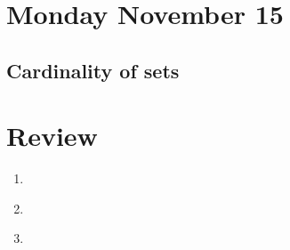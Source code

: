 

\section*{Monday November 15}






\newpage










\newpage


\subsection*{Cardinality of sets}


\newpage
\section*{Review}
\begin{enumerate}
    \item \hspace{1in}\\ 
    \item \hspace{1in}\\ 
    \newpage
    \item \hspace{1in}\\  
\end{enumerate}
\newpage

